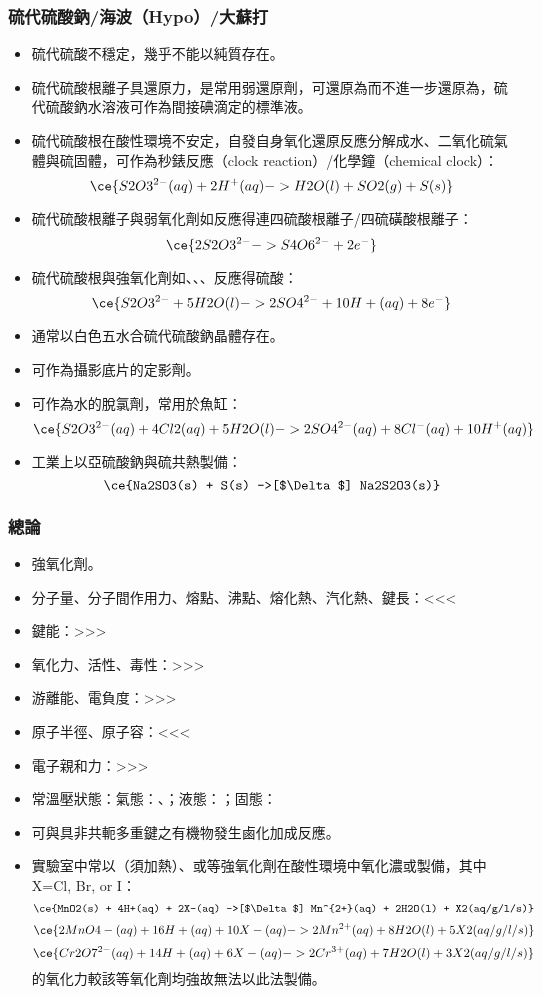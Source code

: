 \documentclass[a4paper,12pt]{report}
\begin{document}
\subsubsection{硫代硫酸鈉/海波（Hypo）/大蘇打}
\begin{itemize}
\item 硫代硫酸不穩定，幾乎不能以純質存在。
\item 硫代硫酸根離子具還原力，是常用弱還原劑，可還原為而不進一步還原為，硫代硫酸鈉水溶液可作為間接碘滴定的標準液。
\item 硫代硫酸根在酸性環境不安定，自發自身氧化還原反應分解成水、二氧化硫氣體與硫固體，可作為秒錶反應（clock reaction）/化學鐘（chemical clock）：
\[\ce{S2O3^{2-}(aq) + 2H^+(aq) -> H2O(l) + SO2(g) + S(s)}\]
\item 硫代硫酸根離子與弱氧化劑如反應得連四硫酸根離子/四硫磺酸根離子：
\[\ce{2S2O3^{2-} -> S4O6^{2-} + 2e^-}\]
\item 硫代硫酸根與強氧化劑如、、、反應得硫酸：
\[\ce{S2O3^{2-} + 5H2O(l) -> 2SO4^{2-} + 10H+(aq) + 8e^-}\]
\item 通常以白色五水合硫代硫酸鈉晶體存在。
\item 可作為攝影底片的定影劑。
\item 可作為水的脫氯劑，常用於魚缸：
\[\ce{S2O3^{2-}(aq) + 4Cl2(aq) + 5H2O(l) -> 2SO4^{2-}(aq) + 8Cl^-(aq) + 10H^+(aq)}\]
\item 工業上以亞硫酸鈉與硫共熱製備：
\[\ce{Na2SO3(s) + S(s) ->[$\Delta$] Na2S2O3(s)}\]
\end{itemize}
\subsubsection{總論}
\begin{itemize}
\item 強氧化劑。
\item 分子量、分子間作用力、熔點、沸點、熔化熱、汽化熱、鍵長：<<<
\item 鍵能：>>>
\item 氧化力、活性、毒性：>>>
\item 游離能、電負度：>>>
\item 原子半徑、原子容：<<<
\item 電子親和力：>>>
\item 常溫壓狀態：氣態：、；液態：；固態：
\item 可與具非共軛多重鍵之有機物發生鹵化加成反應。
\item 實驗室中常以（須加熱）、或等強氧化劑在酸性環境中氧化濃或製備，其中 X=Cl, Br, or I：
\[\ce{MnO2(s) + 4H+(aq) + 2X-(aq) ->[$\Delta$] Mn^{2+}(aq) + 2H2O(l) + X2(aq/g/l/s)}\]
\[\ce{2MnO4-(aq) + 16H+(aq) + 10X-(aq) -> 2Mn^{2+}(aq) + 8H2O(l) + 5X2(aq/g/l/s)}\]
\[\ce{Cr2O7^{2-}(aq) + 14H+(aq) + 6X-(aq) -> 2Cr^{3+}(aq) + 7H2O(l) + 3X2(aq/g/l/s)}\]
的氧化力較該等氧化劑均強故無法以此法製備。
\end{itemize}
\end{document}

